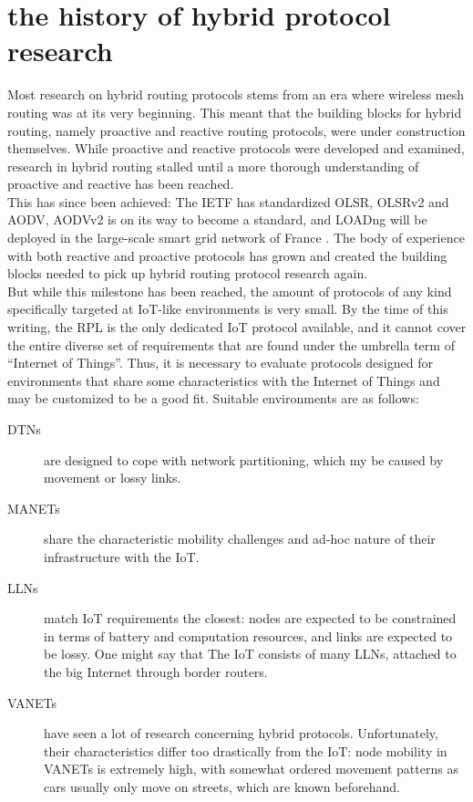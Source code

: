 \documentclass[a4paper,10pt]{scrartcl}
\begin{document}
\section{the history of hybrid protocol research}
\label{sec:related_work}
Most research on hybrid routing protocols stems from an era where wireless mesh routing was at its very beginning. This meant that the building blocks for hybrid routing, namely proactive and reactive routing protocols, were under construction themselves. While proactive and reactive protocols were developed and examined, research in hybrid routing stalled until a more thorough understanding of proactive and reactive has been reached.\\
This has since been achieved: The \gls{IETF} has standardized \gls{OLSR}\cite{RFC-3626}, OLSRv2\cite{RFC-7181} and \gls{AODV}\cite{RFC-3561}, AODVv2\cite{draft-ietf-manet-aodvv2-06} is on its way to become a standard, and \gls{LOADng}\cite{draft-yi-loadngct-02} will be deployed in the large-scale smart grid network of France \cite{X800}. The body of experience with both reactive and proactive protocols has grown and created the building blocks needed to pick up hybrid routing protocol research again.\\

But while this milestone has been reached, the amount of protocols of any kind specifically targeted at IoT-like environments is very small. By the time of this writing, the \gls{RPL}\cite{RFC-6550} is the only dedicated IoT protocol available, and it cannot cover the entire diverse set of requirements that are found under the umbrella term of ``Internet of Things''. Thus, it is necessary to evaluate protocols designed for environments that share some characteristics with the Internet of Things and may be customized to be a good fit. Suitable environments are as follows:
\begin{description}
\item[\glspl{DTN}] are designed to cope with network partitioning, which my be caused by movement or lossy links.
\item[\glspl{MANET}] share the characteristic mobility challenges and ad-hoc nature of their infrastructure with the IoT.
\item[\glspl{LLN}] match IoT requirements the closest: nodes are expected to be constrained in terms of battery and computation resources, and links are expected to be lossy. One might say that The IoT consists of many LLNs, attached to the big Internet through border routers.
\item[\glspl{VANET}] have seen a lot of research concerning hybrid protocols. Unfortunately, their characteristics differ too drastically from the IoT: node mobility in VANETs is extremely high, with somewhat ordered movement patterns as cars usually only move on streets, which are known beforehand. %
\end{description}
\end{document}
